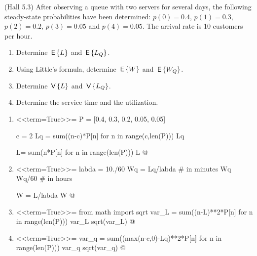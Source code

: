 \begin{exercise}(Hall 5.3) After observing a queue with two servers
  for several days, the following steady-state probabilities have been
  determined: $p(0)=0.4$, $p(1) = 0.3$, $p(2)=0.2$, $p(3)=0.05$ and
  $p(4)=0.05$. The arrival rate is 10 customers per hour.
  \begin{enumerate}
  \item Determine $\,\mathsf{E}\left\{L\right\}$ and  $\,\mathsf{E}\left\{L_Q\right\}$. 
  \item Using Little's formula, determine $\,\mathsf{E}\left\{W\right\}$ and $\,\mathsf{E}\left\{W_Q\right\}$. 
  \item Determine $\,\mathsf{V}\left\{L\right\}$ and $\,\mathsf{V}\left\{L_Q\right\}$.
  \item Determine the service time and the utilization.
  \end{enumerate}
  \begin{solution}
    \begin{enumerate}
    \item 
<<term=True>>=
P = [0.4, 0.3, 0.2, 0.05, 0.05]

c = 2
Lq = sum((n-c)*P[n] for n in range(c,len(P)))
Lq

L= sum(n*P[n] for n in range(len(P)))
L
@

\item 
<<term=True>>=
labda = 10./60
Wq = Lq/labda # in minutes
Wq
Wq/60 # in hours

W = L/labda
W
@ 

\item 
<<term=True>>=
from math import sqrt
var_L = sum((n-L)**2*P[n] for n in range(len(P)))
var_L
sqrt(var_L)
@ 

\item 
<<term=True>>=
var_q = sum((max(n-c,0)-Lq)**2*P[n] for n in range(len(P)))
var_q
sqrt(var_q)
@

  \end{enumerate}
    \end{solution}
\end{exercise}  

